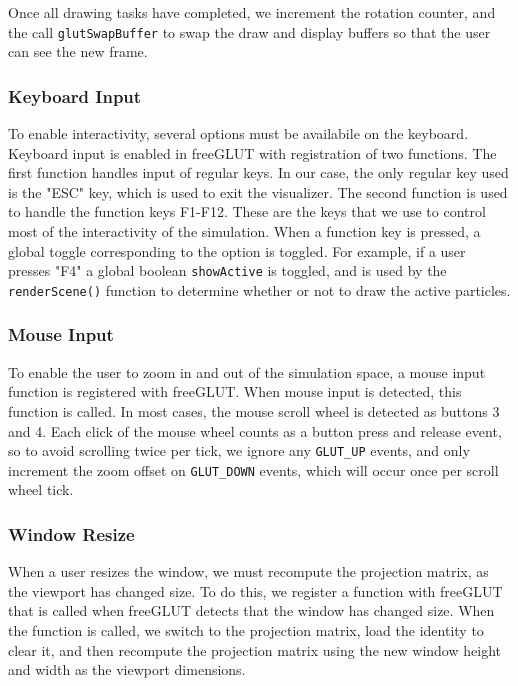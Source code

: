 \documentclass[fleqn,10pt]{UserGuideArx} %
\begin{document}
    Once all drawing tasks have completed, we increment the rotation counter, and the call \texttt{glutSwapBuffer} to swap the draw and display buffers so that the user can see the new frame.\\
    
\subsubsection{Keyboard Input}
    To enable interactivity, several options must be availabile on the keyboard. Keyboard input is enabled in freeGLUT with registration of two functions. The first function handles input of regular keys. In our case, the only regular key used is the "ESC" key, which is used to exit the visualizer. The second function is used to handle the function keys F1-F12. These are the keys that we use to control most of the interactivity of the simulation. When a function key is pressed, a global toggle corresponding to the option is toggled. For example, if a user presses "F4" a global boolean \texttt{showActive} is toggled, and is used by the \texttt{renderScene()} function to determine whether or not to draw the active particles.\\
    
\subsubsection{Mouse Input}
    To enable the user to zoom in and out of the simulation space, a mouse input function is registered with freeGLUT. When mouse input is detected, this function is called. In most cases, the mouse scroll wheel is detected as buttons 3 and 4. Each click of the mouse wheel counts as a button press and release event, so to avoid scrolling twice per tick, we ignore any \texttt{GLUT\_UP} events, and only increment the zoom offset on \texttt{GLUT\_DOWN} events, which will occur once per scroll wheel tick.\\
     
\subsubsection{Window Resize}
    When a user resizes the window, we must recompute the projection matrix, as the viewport has changed size. To do this, we register a function with freeGLUT that is called when freeGLUT detects that the window has changed size. When the function is called, we switch to the projection matrix, load the identity to clear it, and then recompute the projection matrix using the new window height and width as the viewport dimensions.\\
    
\end{document}
